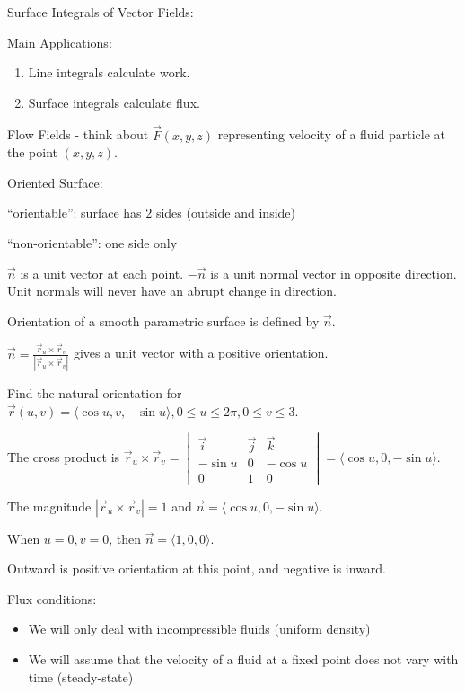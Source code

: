\documentclass[../calc3.tex]{subfiles}
\begin{document}
Surface Integrals of Vector Fields:

Main Applications:
\begin{enumerate}
    \item Line integrals calculate work.
    \item Surface integrals calculate flux.
\end{enumerate}

Flow Fields - think about $\vec{F}(x,y,z)$ representing velocity of a fluid particle at the point $(x,y,z)$.

Oriented Surface:

``orientable'': surface has $2$ sides (outside and inside)

``non-orientable'': one side only 

$\vec{n}$ is a unit vector at each point. $-\vec{n}$ is a unit normal vector in opposite direction. Unit normals will never have an abrupt change in direction.

Orientation of a smooth parametric surface is defined by $\vec{n}$.

$\vec{n}=\frac{\vec{r}_u\times \vec{r}_v}{|\vec{r}_u\times \vec{r}_v|}$ gives a unit vector with a positive orientation.

\begin{example}
    Find the natural orientation for $\vec{r}(u,v)=\langle \cos u, v,-\sin u\rangle, 0\leq u\leq 2\pi, 0\leq v\leq 3$.

    The cross product is $\vec{r}_u\times \vec{r}_v = \begin{vmatrix}
        \vec{i} & \vec{j} & \vec{k}\\
        -\sin u & 0 & -\cos u\\
        0 & 1 & 0
    \end{vmatrix}=\langle \cos u, 0,-\sin u\rangle$.

    The magnitude $|\vec{r}_u\times \vec{r}_v| =1$ and $\vec{n}=\langle \cos u,0,-\sin u\rangle$.

    When $u=0, v=0$, then $\vec{n}=\langle 1,0,0\rangle$.

    Outward is positive orientation at this point, and negative is inward.
\end{example}

Flux conditions:
\begin{itemize}
    \item We will only deal with incompressible fluids (uniform density)
    \item We will assume that the velocity of a fluid at a fixed point does not vary with time (steady-state)
\end{itemize}
\end{document}
